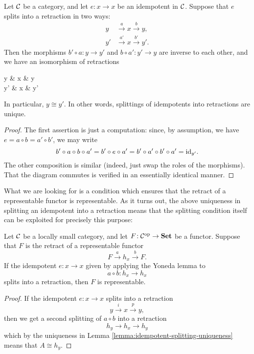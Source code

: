 \begin{lemma}\label{lemma:idempotent-splitting-uniqueness}
	Let \(\mathcal{C}\) be a category, and let \(e\!:x\to x\) be an idempotent in \(\mathcal{C}\). Suppose that \(e\) splits into a retraction in two ways:
	\begin{align*}
	y &\overset{a}\to x\overset{b}\to y, \\
	y' &\overset{a'}\to x\overset{b'}\to y'.
	\end{align*}
	Then the morphisms \(b'\circ a\!:y\to y'\) and \(b\circ a'\!:y'\to y\) are inverse to each other, and we have an isomorphism of retractions
	\begin{diagram*}
		y \ar[r,"a"] & x \ar[r,"b"]\ar[d,equal] & y \\
		y' \ar[r,"a'"] & x \ar[r,"b'"] & y'
	\end{diagram*}
	In particular, \(y\cong y'\). In other words, splittings of idempotents into retractions are unique.
\end{lemma}
\begin{proof}
The first assertion is just a computation: since, by assumption, we have \(e = a\circ b = a'\circ b'\), we may write
\[ b'\circ a \circ b \circ a' = b'\circ e\circ a' = b'\circ a'\circ b'\circ a' = \mathrm{id}_{y'}. \]
The other composition is similar (indeed, just swap the roles of the morphisms). That the diagram commutes is verified in an essentially identical manner.
\end{proof}

What we are looking for is a condition which ensures that the retract of a representable functor is representable. As it turns out, the above uniqueness in splitting an idempotent into
a retraction means that the splitting condition itself can be exploited for precisely this purpose:
\begin{lemma}\label{lemma:retract-of-representable-is-representable-if-idempotent-splits}
	Let \(\mathcal{C}\) be a locally small category, and let \(F\!:\mathcal{C}^{\mathrm{op}}\to\mathbf{Set}\) be a functor. Suppose that \(F\) is the retract of a representable functor
	\[ F \overset{a}\to h_x \overset{b}\to F. \]
	If the idempotent \(e\!:x\to x\) given by applying the Yoneda lemma to
	\[ a\circ b\!:h_x\to h_x \]
	splits into a retraction, then \(F\) is representable.
\end{lemma}
\begin{proof}
If the idempotent \(e\!:x\to x\) splits into a retraction
\[ y \overset{i}\to x \overset{p}\to y, \]
then we get a second splitting of \(a\circ b\) into a retraction
\[ h_{y} \to h_x \to h_{y} \]
which by the uniqueness in Lemma \ref{lemma:idempotent-splitting-uniqueness} means that \(A\cong h_{y}\).
\end{proof}

